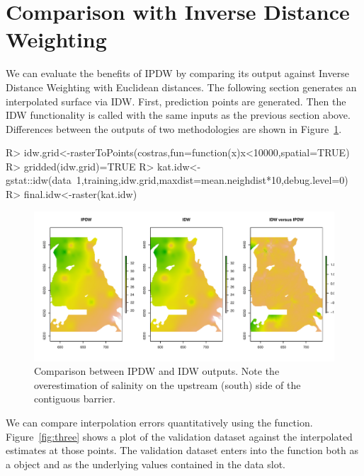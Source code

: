\documentclass[nojss,shortnames]{jss}
\begin{document}
\section{Comparison with Inverse Distance Weighting}

We can evaluate the benefits of IPDW by comparing its output against Inverse Distance Weighting with Euclidean distances. The following section generates an interpolated surface via IDW. First, prediction points are generated. Then the  \citep{peb2004} IDW functionality is called with the same inputs as the previous section above. Differences between the outputs of two methodologies are shown in Figure~\ref{fig:two}.

\begin{Schunk}
\begin{Sinput}
R> idw.grid<-rasterToPoints(costras,fun=function(x){x<10000},spatial=TRUE)
R> gridded(idw.grid)=TRUE
R> kat.idw<-gstat::idw(data~1,training,idw.grid,maxdist=mean.neighdist*10,debug.level=0)
R> final.idw<-raster(kat.idw)
\end{Sinput}
\end{Schunk}

\begin{figure}[h!]
\begin{center}
\includegraphics{ipdw-figure2}
\end{center}
\vspace{-20pt}
\caption{Comparison between IPDW and IDW outputs. Note the overestimation of salinity on the upstream (south) side of the contiguous barrier. }
\label{fig:two}
\end{figure}
\FloatBarrier

We can compare interpolation errors quantitatively using the  function. Figure~\ref{fig:three} shows a plot of the validation dataset against the interpolated estimates at those points. The validation dataset enters into the function both as a  object and as the underlying values contained in the data slot.  
\end{document}
